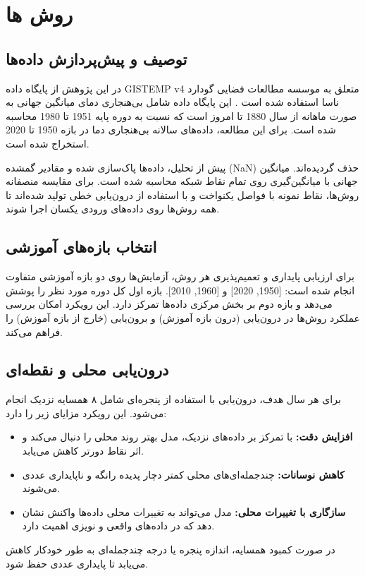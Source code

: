 \section{روش ها}

\subsection{توصیف و پیش‌پردازش داده‌ها}

در این پژوهش از پایگاه داده GISTEMP v4 متعلق به موسسه مطالعات فضایی گودارد ناسا استفاده شده است \cite{gistemp}. این پایگاه داده شامل بی‌هنجاری دمای میانگین جهانی به صورت ماهانه از سال 1880 تا امروز است که نسبت به دوره پایه 1951 تا 1980 محاسبه شده است. برای این مطالعه، داده‌های سالانه بی‌هنجاری دما در بازه 1950 تا 2020 استخراج شده است.

پیش از تحلیل، داده‌ها پاک‌سازی شده و مقادیر گمشده (NaN) حذف گردیده‌اند. میانگین جهانی با میانگین‌گیری روی تمام نقاط شبکه محاسبه شده است. برای مقایسه منصفانه روش‌ها، نقاط نمونه با فواصل یکنواخت و با استفاده از درون‌یابی خطی تولید شده‌اند تا همه روش‌ها روی داده‌های ورودی یکسان اجرا شوند.

\subsection{انتخاب بازه‌های آموزشی}

برای ارزیابی پایداری و تعمیم‌پذیری هر روش، آزمایش‌ها روی دو بازه آموزشی متفاوت انجام شده است: [1950, 2020] و [1960, 2010]. بازه اول کل دوره مورد نظر را پوشش می‌دهد و بازه دوم بر بخش مرکزی داده‌ها تمرکز دارد. این رویکرد امکان بررسی عملکرد روش‌ها در درون‌یابی (درون بازه آموزش) و برون‌یابی (خارج از بازه آموزش) را فراهم می‌کند.

\subsection{درون‌یابی محلی و نقطه‌ای}

برای هر سال هدف، درون‌یابی با استفاده از پنجره‌ای شامل ۸ همسایه نزدیک انجام می‌شود. این رویکرد مزایای زیر را دارد:
\begin{itemize}
    \item \textbf{افزایش دقت:} با تمرکز بر داده‌های نزدیک، مدل بهتر روند محلی را دنبال می‌کند و اثر نقاط دورتر کاهش می‌یابد.
    \item \textbf{کاهش نوسانات:} چندجمله‌ای‌های محلی کمتر دچار پدیده رانگه و ناپایداری عددی می‌شوند.
    \item \textbf{سازگاری با تغییرات محلی:} مدل می‌تواند به تغییرات محلی داده‌ها واکنش نشان دهد که در داده‌های واقعی و نویزی اهمیت دارد.
\end{itemize}
در صورت کمبود همسایه، اندازه پنجره یا درجه چندجمله‌ای به طور خودکار کاهش می‌یابد تا پایداری عددی حفظ شود.

